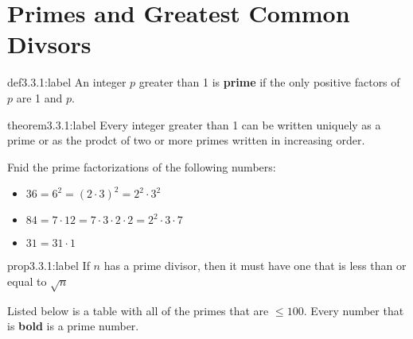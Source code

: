 \section{Primes and Greatest Common Divsors}

\begin{definition}{def3.3.1:label}
    An integer $p$ greater than 1 is \textbf{prime} if the only positive factors of $p$ are 1 and $p$.
\end{definition}

\begin{theorem}{theorem3.3.1:label}
    Every integer greater than 1 can be written uniquely as a prime or as the prodct of two or more primes written in increasing order.
\end{theorem}

\begin{problem}
    Fnid the prime factorizations of the following numbers:

    \begin{itemize}
        \item $36 = 6^2 = (2\cdot 3)^2 = 2^2\cdot 3^2$\\
        \item $84 = 7 \cdot 12 = 7 \cdot 3 \cdot 2 \cdot 2 = 2^2\cdot 3 \cdot 7$
        \item $31 = 31 \cdot 1$
    \end{itemize}
\end{problem}

\begin{proposition}{prop3.3.1:label}
    If $n$ has a prime divisor, then it must have one that is less than or equal to $\sqrt{n}$
\end{proposition}

Listed below is a table with all of the primes that are $\le 100$. Every number that is \textbf{bold} is a prime number.

